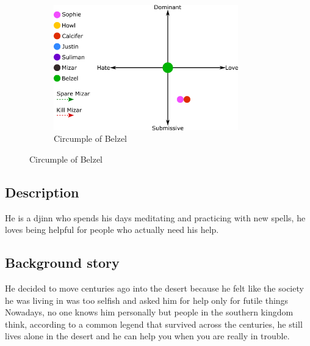 \begin{figure}
\centering
\begin{subfigure}
  \centering
  \includegraphics[width=8cm]{Images/Circumplexes/belzelCircumplex}
  \caption{Circumple of Belzel}
\end{subfigure}
\end{figure}

\subsection{Description}
He is a djinn who spends his days meditating and practicing with new spells, he loves being helpful for people who actually need his help. 


\subsection{Background story}
He decided to move centuries ago into the desert because he felt like the society he was living in was too selfish and asked him for help only for futile things 
Nowadays, no one knows him personally but people in the southern kingdom think, according to a common legend that survived across the centuries, he still lives alone in the desert and he can help you when you are really in trouble.



